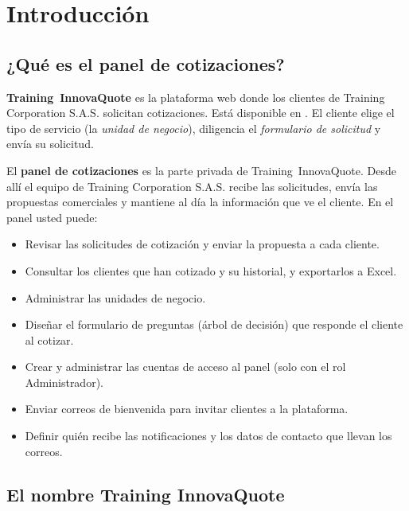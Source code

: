 \chapter{Introducción}\label{cap:intro}


\section{¿Qué es el panel de cotizaciones?}\label{sec:que-es}

\textbf{Training~InnovaQuote} es la plataforma web donde los clientes de Training Corporation S.A.S. solicitan
cotizaciones. Está disponible en \ruta{\dominio}. El cliente elige el tipo de servicio (la
\emph{unidad de negocio}), diligencia el \emph{formulario de solicitud} y envía su solicitud.

El \textbf{panel de cotizaciones} es la parte privada de Training~InnovaQuote. Desde allí el equipo de
Training Corporation S.A.S. recibe las solicitudes, envía las propuestas comerciales y mantiene
al día la información que ve el cliente. En el panel usted puede:

\begin{itemize}
  \item Revisar las solicitudes de cotización y enviar la propuesta a cada cliente.
  \item Consultar los clientes que han cotizado y su historial, y exportarlos a Excel.
  \item Administrar las unidades de negocio.
  \item Diseñar el formulario de preguntas (árbol de decisión) que responde el cliente al cotizar.
  \item Crear y administrar las cuentas de acceso al panel (solo con el rol Administrador).
  \item Enviar correos de bienvenida para invitar clientes a la plataforma.
  \item Definir quién recibe las notificaciones y los datos de contacto que llevan los correos.
\end{itemize}

\section{El nombre Training InnovaQuote}\label{sec:nombre}

